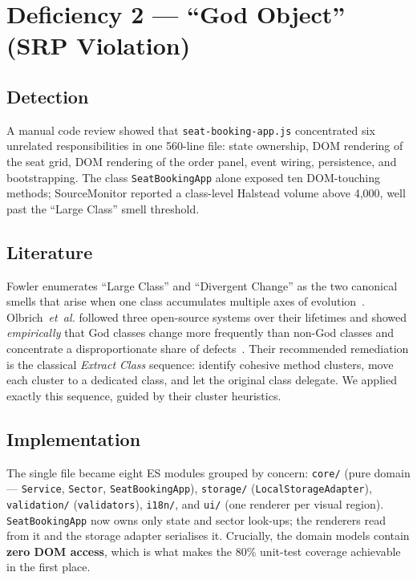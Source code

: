 \documentclass[a4paper,11pt]{article}
\begin{document}
\section{Deficiency 2 --- ``God Object'' (SRP Violation)}
\subsection{Detection}
A manual code review showed that \texttt{seat-booking-app.js} concentrated
six unrelated responsibilities in one 560-line file: state ownership,
DOM rendering of the seat grid, DOM rendering of the order panel,
event wiring, persistence, and bootstrapping.  The class
\texttt{SeatBookingApp} alone exposed ten DOM-touching methods;
SourceMonitor reported a class-level Halstead volume above 4{,}000,
well past the ``Large Class'' smell threshold.

\subsection{Literature}
Fowler enumerates ``Large Class'' and ``Divergent Change'' as the two
canonical smells that arise when one class accumulates multiple axes
of evolution~\cite{fowler2018refactoring}.  Olbrich~\textit{et~al.}
followed three open-source systems over their lifetimes and showed
\textit{empirically} that God classes change more frequently than
non-God classes and concentrate a disproportionate share of
defects~\cite{olbrich2010god}.  Their recommended remediation is the
classical \textit{Extract Class} sequence: identify cohesive method
clusters, move each cluster to a dedicated class, and let the
original class delegate.  We applied exactly this sequence, guided by
their cluster heuristics.

\subsection{Implementation}
The single file became eight ES modules grouped by concern:
\texttt{core/} (pure domain --- \texttt{Service}, \texttt{Sector},
\texttt{SeatBookingApp}), \texttt{storage/}
(\texttt{LocalStorageAdapter}), \texttt{validation/}
(\texttt{validators}), \texttt{i18n/}, and \texttt{ui/} (one renderer
per visual region).  \texttt{SeatBookingApp} now owns only state and
sector look-ups; the renderers read from it and the storage adapter
serialises it.  Crucially, the domain models contain
\textbf{zero DOM access}, which is what makes the 80\% unit-test
coverage achievable in the first place.
\end{document}
